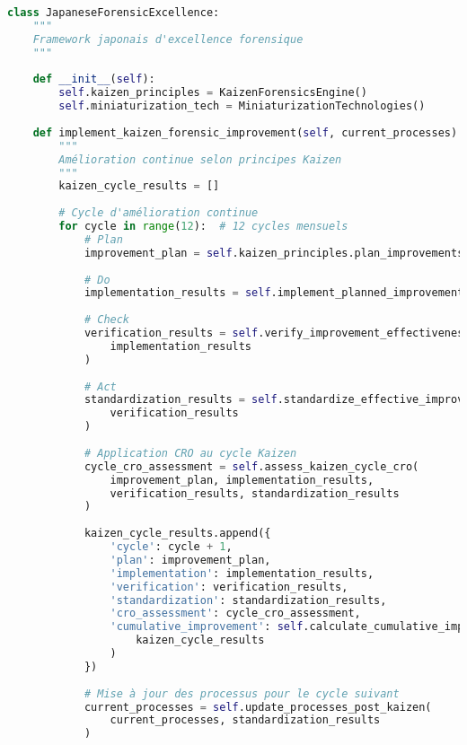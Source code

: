 \begin{lstlisting}[language=Python, caption=Framework japonais de perfectionnement forensique]
class JapaneseForensicExcellence:
    """
    Framework japonais d'excellence forensique
    """
    
    def __init__(self):
        self.kaizen_principles = KaizenForensicsEngine()
        self.miniaturization_tech = MiniaturizationTechnologies()
        
    def implement_kaizen_forensic_improvement(self, current_processes):
        """
        Amélioration continue selon principes Kaizen
        """
        kaizen_cycle_results = []
        
        # Cycle d'amélioration continue
        for cycle in range(12):  # 12 cycles mensuels
            # Plan
            improvement_plan = self.kaizen_principles.plan_improvements(current_processes)
            
            # Do
            implementation_results = self.implement_planned_improvements(improvement_plan)
            
            # Check
            verification_results = self.verify_improvement_effectiveness(
                implementation_results
            )
            
            # Act
            standardization_results = self.standardize_effective_improvements(
                verification_results
            )
            
            # Application CRO au cycle Kaizen
            cycle_cro_assessment = self.assess_kaizen_cycle_cro(
                improvement_plan, implementation_results, 
                verification_results, standardization_results
            )
            
            kaizen_cycle_results.append({
                'cycle': cycle + 1,
                'plan': improvement_plan,
                'implementation': implementation_results,
                'verification': verification_results,
                'standardization': standardization_results,
                'cro_assessment': cycle_cro_assessment,
                'cumulative_improvement': self.calculate_cumulative_improvement(
                    kaizen_cycle_results
                )
            })
            
            # Mise à jour des processus pour le cycle suivant
            current_processes = self.update_processes_post_kaizen(
                current_processes, standardization_results
            )
            

\end{lstlisting}
